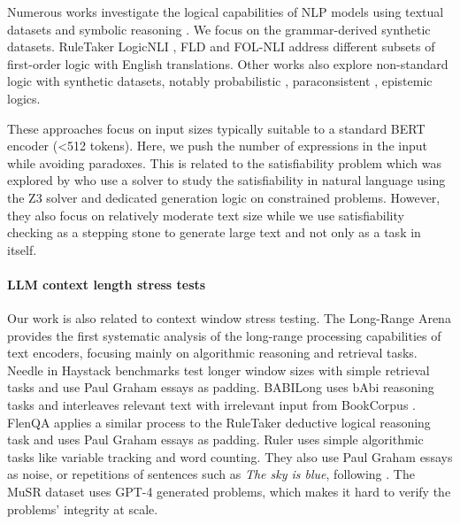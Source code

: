 \documentclass[11pt]{article}
\begin{document}
Numerous works investigate the logical capabilities of NLP models using textual datasets and symbolic reasoning \cite{helwe2022logitorch}. We focus on the grammar-derived synthetic datasets. RuleTaker \citep{ruletaker} LogicNLI \citep{tian-etal-2021-diagnosing}, FLD \cite{fld23} and FOL-NLI \cite{sileo2024scaling} address different subsets of first-order logic with English translations. Other works also explore non-standard logic with synthetic datasets, notably probabilistic \citep{jin2023cladder,sileo2022probing}, paraconsistent \cite{kazemi2024boardgameqa}, epistemic \cite{sileo-lernould-2023-mindgames} logics.

These approaches focus on input sizes typically suitable to a standard BERT \cite{devlin2018bert} encoder (<512 tokens). Here, we push the number of expressions in the input while avoiding paradoxes. This is related to the satisfiability problem which was explored by \citet{fragmentsaaai,richardson2022pushing} who use a solver to study the satisfiability in natural language using the Z3 solver and dedicated generation logic on constrained problems.  However, they also focus on relatively moderate text size while we use satisfiability checking as a stepping stone to generate large text and not only as a task in itself.

\paragraph{LLM context length stress tests}  Our work is also related to context window stress testing. The Long-Range Arena \cite{tay2021long} provides the first systematic analysis of the long-range processing capabilities of text encoders, focusing mainly on algorithmic reasoning and retrieval tasks. Needle in Haystack benchmarks \cite{kamradt2023needlenih,li2024needlebench} test longer window sizes with simple retrieval tasks and use Paul Graham essays as padding. BABILong   \cite{kuratov2024babilong} uses bAbi \cite{babi} reasoning tasks and interleaves relevant text with irrelevant input from BookCorpus \cite{Zhu_2015_ICCV}. FlenQA \cite{levy2024same} applies a similar process to the RuleTaker \cite{ruletaker} deductive logical reasoning task and uses Paul Graham essays as padding. Ruler uses simple algorithmic tasks like variable tracking and word counting. They also use Paul Graham essays as noise, or repetitions of sentences such as \textit{The sky is blue}, following \citet{mohtashami2024random}. %
The MuSR dataset uses GPT-4 generated \cite{sprague2023musr} problems, which makes it hard to verify the problems' integrity at scale.
\end{document}
